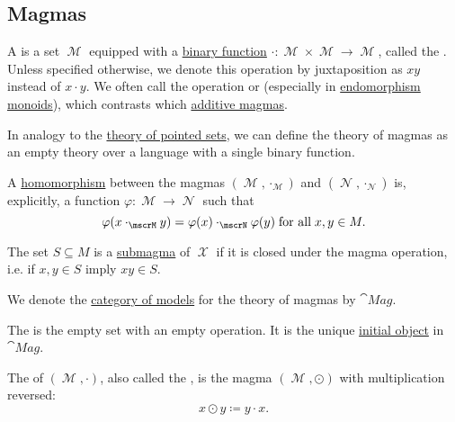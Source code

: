 \subsection{Magmas}\label{subsec:magmas}

\begin{definition}\label{def:magma}
  A  is a set \( \mscrM \) equipped with a \hyperref[def:multi_valued_function/arguments]{binary function} \( \cdot: \mscrM \times \mscrM \to \mscrM \), called the . Unless specified otherwise, we denote this operation by juxtaposition as \( xy \) instead of \( x \cdot y \). We often call the operation  or  (especially in \hyperref[def:endomorphism_monoid]{endomorphism monoids}), which contrasts which \hyperref[rem:additive_magma]{additive magmas}.

  \begin{thmenum}
     In analogy to the \hyperref[def:pointed_set/theory]{theory of pointed sets}, we can define the theory of magmas as an empty theory over a language with a single binary function.

     A \hyperref[def:first_order_homomorphism]{homomorphism} between the magmas \( (\mscrM, \cdot_{\mscrM}) \) and \( (\mscrN, \cdot_{\mscrN}) \) is, explicitly, a function \( \varphi: \mscrM \to \mscrN \) such that
    \begin{equation}\label{eq:def:magma/homomorphism}
      \varphi(x \cdot_{\mscrM} y) = \varphi(x) \cdot_{\mscrN} \varphi(y) \T{for all} x, y \in M.
    \end{equation}

     The set \( S \subseteq M \) is a \hyperref[def:first_order_substructure]{submagma} of \( \mscrX \) if it is closed under the magma operation, i.e. if \( x, y \in S \) imply \( xy \in S \).

     We denote the \hyperref[def:category_of_small_first_order_models]{category of models} for the theory of magmas by \( \cat{Mag} \).

     The  is the empty set with an empty operation. It is the unique \hyperref[def:zero_objects/initial]{initial object} in \( \cat{Mag} \).

     The  of \( (\mscrM, \cdot) \), also called the , is the magma \( (\mscrM, \odot) \) with multiplication reversed:
    \begin{equation*}
      x \odot y \coloneqq y \cdot x.
    \end{equation*}


\end{thmenum}
\end{definition}
